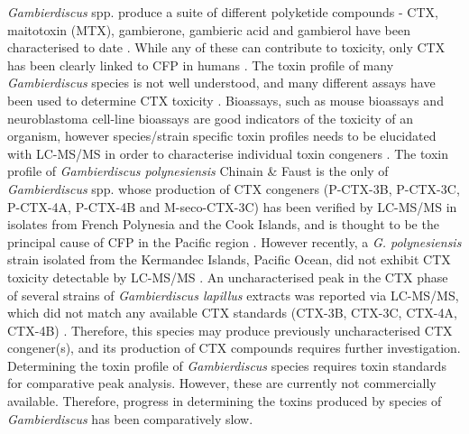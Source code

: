 \documentclass[12pt]{article}
\begin{document}
\emph{Gambierdiscus} spp. produce a suite of different polyketide compounds - CTX, maitotoxin (MTX), gambierone, gambieric acid and gambierol have been characterised to date \citep{satake1993gambierol,nagai1992gambieric,rodriguez2015gambierone,murata1993structure,murata1989structures}. While any of these can contribute to toxicity, only CTX has been clearly linked to CFP in humans \citep{chinain1997intraspecific,holmes1998gambierdiscus}. The toxin profile of many \textit{Gambierdiscus} species is not well understood, and many different assays have been used to determine CTX toxicity \citep{globalcig}. Bioassays, such as mouse bioassays and neuroblastoma cell-line bioassays are good indicators of the toxicity of an organism, however species/strain specific toxin profiles needs to be elucidated with LC-MS/MS in order to characterise individual toxin congeners \citep{diogened2014chemistry}. The toxin profile of \textit{Gambierdiscus polynesiensis} Chinain \& Faust is the only of \emph{Gambierdiscus} spp.
whose production of CTX congeners (P-CTX-3B, P-CTX-3C, P-CTX-4A, P-CTX-4B and M-seco-CTX-3C) has been verified by LC-MS/MS in isolates from French Polynesia and the Cook Islands, and is thought to be the principal cause of CFP in the Pacific region \citep{chinain2010growth,rhodes2014production}. However recently, a \emph{G. polynesiensis} strain isolated from the Kermandec Islands, Pacific Ocean, did not exhibit CTX toxicity detectable by LC-MS/MS  \citep{rhodes2017epiphytic}.
An uncharacterised peak in the CTX phase of several strains of \emph{Gambierdiscus lapillus} extracts was reported via LC-MS/MS, which did not match any available CTX standards (CTX-3B, CTX-3C, CTX-4A, CTX-4B) \citep{kretzschmar2016characterization}. Therefore, this species may produce previously uncharacterised CTX congener(s), and its production of CTX compounds requires further investigation.
Determining the toxin profile of \textit{Gambierdiscus} species requires toxin standards for comparative peak analysis. However, these are currently not commercially available. Therefore, progress in determining the toxins produced by species of \emph{Gambierdiscus} has been comparatively slow.\\

\end{document}
